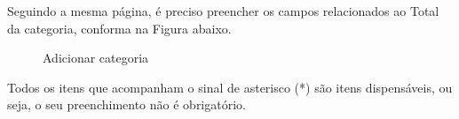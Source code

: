 Seguindo a mesma página, é preciso preencher os campos relacionados ao Total da categoria, conforma na Figura abaixo.

\begin{figure}[htbp]
 \begin{center}
  \caption{Adicionar categoria}
  \label{fig:cap6_13}
 \end{center}
\end{figure}
Todos os itens que acompanham o sinal de asterisco (*) são itens dispensáveis, ou seja, o seu preenchimento não é obrigatório.

